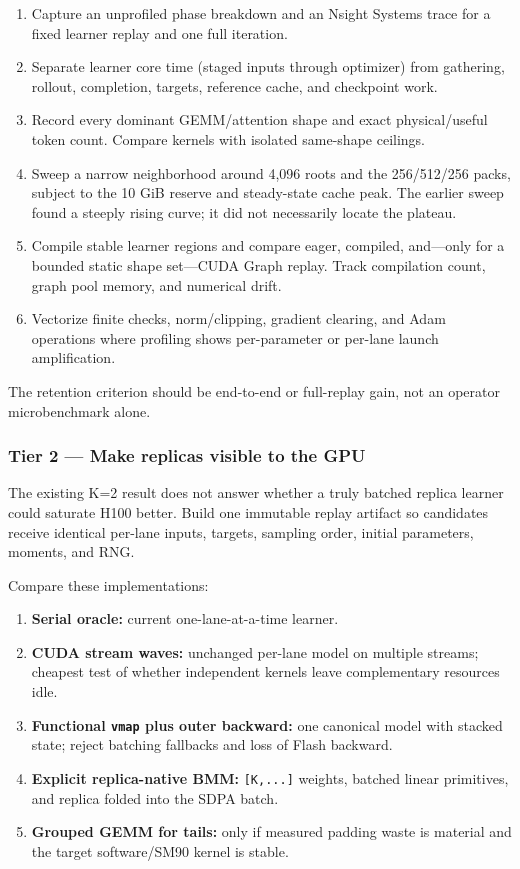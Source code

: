 \documentclass[
  10pt,
  letterpaper,
]{article}
\providecommand{\tightlist}{%
  \setlength{\itemsep}{0pt}\setlength{\parskip}{0pt}}
\begin{document}
\begin{enumerate}
\def\labelenumi{\arabic{enumi}.}
\tightlist
\item
  Capture an unprofiled phase breakdown and an Nsight Systems trace for
  a fixed learner replay and one full iteration.
\item
  Separate learner core time (staged inputs through optimizer) from
  gathering, rollout, completion, targets, reference cache, and
  checkpoint work.
\item
  Record every dominant GEMM/attention shape and exact physical/useful
  token count. Compare kernels with isolated same-shape ceilings.
\item
  Sweep a narrow neighborhood around 4,096 roots and the 256/512/256
  packs, subject to the 10 GiB reserve and steady-state cache peak. The
  earlier sweep found a steeply rising curve; it did not necessarily
  locate the plateau.
\item
  Compile stable learner regions and compare eager, compiled, and---only
  for a bounded static shape set---CUDA Graph replay. Track compilation
  count, graph pool memory, and numerical drift.
\item
  Vectorize finite checks, norm/clipping, gradient clearing, and Adam
  operations where profiling shows per-parameter or per-lane launch
  amplification.
\end{enumerate}

The retention criterion should be end-to-end or full-replay gain, not an
operator microbenchmark alone.

\subsubsection{Tier 2 --- Make replicas visible to the
GPU}\label{tier-2--make-replicas-visible-to-the-gpu}

The existing K=2 result does not answer whether a truly batched replica
learner could saturate H100 better. Build one immutable replay artifact
so candidates receive identical per-lane inputs, targets, sampling
order, initial parameters, moments, and RNG.

Compare these implementations:

\begin{enumerate}
\def\labelenumi{\arabic{enumi}.}
\tightlist
\item
  \textbf{Serial oracle:} current one-lane-at-a-time learner.
\item
  \textbf{CUDA stream waves:} unchanged per-lane model on multiple
  streams; cheapest test of whether independent kernels leave
  complementary resources idle.
\item
  \textbf{Functional \texttt{vmap} plus outer backward:} one canonical
  model with stacked state; reject batching fallbacks and loss of Flash
  backward.
\item
  \textbf{Explicit replica-native BMM:} \texttt{{[}K,...{]}} weights,
  batched linear primitives, and replica folded into the SDPA batch.
\item
  \textbf{Grouped GEMM for tails:} only if measured padding waste is
  material and the target software/SM90 kernel is stable.
\end{enumerate}
\end{document}
